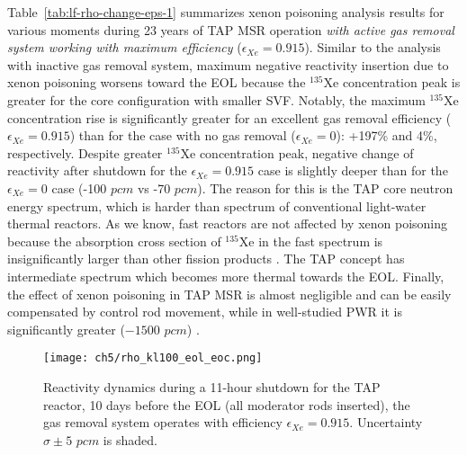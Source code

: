 Table~\ref{tab:lf-rho-change-eps-1}  summarizes xenon poisoning analysis 
results for various moments during 23 years of \gls{TAP} \gls{MSR} operation 
\emph{with active gas removal system working with maximum efficiency}
($\epsilon_{Xe}=0.915$). Similar to the analysis with inactive gas removal 
system, maximum negative reactivity insertion due to xenon poisoning worsens 
toward the \gls{EOL} because the $^{135}$Xe concentration peak is greater for 
the core configuration with smaller SVF. Notably, the maximum $^{135}$Xe 
concentration rise is significantly greater for an excellent gas removal 
efficiency ($\epsilon_{Xe}=0.915$) than for the case with no gas removal 
($\epsilon_{Xe}=0$): +197\% and 4\%, respectively. Despite greater $^{135}$Xe 
concentration peak, negative change of reactivity after shutdown for the 
$\epsilon_{Xe}=0.915$ case is slightly deeper than for the 
$\epsilon_{Xe}=0$ case (-100 $pcm$ vs -70 $pcm$). The reason for this is the 
\gls{TAP} core neutron energy spectrum, which is harder than spectrum of 
conventional light-water thermal reactors. As we know, fast reactors are not 
affected by xenon poisoning because the absorption cross section of $^{135}$Xe 
in the fast spectrum is insignificantly larger than other fission products 
\cite{bell_nuclear_1970, 
svanstrom_load_2016-2}. The \gls{TAP} concept has intermediate spectrum which 
becomes more thermal towards the \gls{EOL}. Finally, the effect of xenon 
poisoning in \gls{TAP} \gls{MSR} is almost negligible and can be easily 
compensated by control rod movement, while in well-studied \gls{PWR} it is 
significantly greater ($-1500$ $pcm$) \cite{rykhlevskii_impact_2019}.
\begin{figure}[htp!] %
	\centering
	\texttt{[image: ch5/rho\_kl100\_eol\_eoc.png]}
		\vspace{-5mm}
	\caption{Reactivity dynamics during a 11-hour shutdown for the 
		\gls{TAP} reactor, 10 days before the \gls{EOL} (all moderator rods 
		inserted), the gas removal system operates with efficiency 
		$\epsilon_{Xe}=0.915$. Uncertainty $\sigma\pm5$ $pcm$ is 
		shaded.}
	\label{fig:lf-tap-rho-kl100-eol-eoc}
\end{figure}
	\vspace{-5mm}
